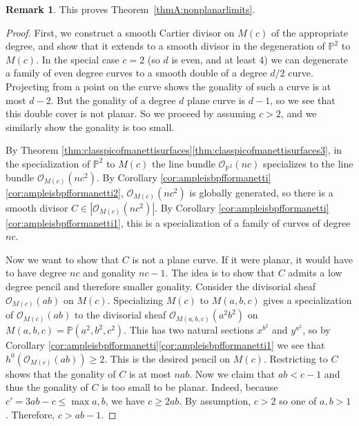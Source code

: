 \documentclass[JEP,XML,SOM,Unicode,NoFloatCountersInSection,published]{cedram}
\theoremstyle{plain}
\theoremstyle{definition}
\newtheorem{remark}[theorem]{Remark}
\newcommand\PP{{\mathbb{P}}}
\newcommand\Oc{{\mathcal O}}
\newcommand\Pabc{{\PP(a^2,b^2,c^2)}}
\begin{document}
\begin{remark}
This proves Theorem~\ref{thmA:nonplanarlimits}.
\end{remark}

\begin{proof}
First, we construct a smooth Cartier divisor on $M(c)$ of the appropriate degree, and show that it extends to a smooth divisor in the degeneration of $\PP^2$ to $M(c)$. In the special case $c=2$ (so $d$ is even, and at least 4) we can degenerate a family of even degree curves to a smooth double of a degree $d/2$ curve. Projecting from a point on the curve shows the gonality of such a curve is at most $d-2$. But the gonality of a degree $d$ plane curve is $d-1$, so we see that this double cover is not planar. So we proceed by assuming $c>2$, and we similarly show the gonality is too small.

By Theorem \ref{thm:classpicofmanettisurfaces}\eqref{thm:classpicofmanettisurfaces3}, in the specialization of $\PP^2$ to $M(c)$ the line bundle $\Oc_{\PP^2}(nc)$ specializes to the line bundle $\Oc_{M(c)}(nc^2)$. By Corollary \ref{cor:ampleisbpfformanetti}\eqref{cor:ampleisbpfformanetti2}, $\Oc_{M(c)}(nc^2)$ is globally generated, so there is a smooth divisor $C\in |\Oc_{M(c)}(nc^2)|$. By Corollary \ref{cor:ampleisbpfformanetti}\eqref{cor:ampleisbpfformanetti1}, this is a specialization of a family of curves of degree $nc$.

Now we want to show that $C$ is not a plane curve. If it were planar, it would have to have degree $nc$ and gonality $nc-1$. The idea is to show that $C$ admits a low degree pencil and therefore smaller gonality. Consider the divisorial sheaf $\Oc_{M(c)}(ab)$ on $M(c)$. Specializing $M(c)$ to $M(a,b,c)$ gives a specialization of $\Oc_{M(c)}(ab)$ to the divisorial sheaf $\Oc_{M(a,b,c)}(a^2b^2)$ on $M(a,b,c)=\Pabc$. This has two natural sections $x^{b^2}$ and $y^{a^2}$, so by Corollary \ref{cor:ampleisbpfformanetti}\eqref{cor:ampleisbpfformanetti1} we see that $h^0(\Oc_{M(c)}(ab))\ge 2$. This is the desired pencil on $M(c)$. Restricting to $C$ shows that the gonality of $C$ is at most $nab$. Now we claim that $ab< c-1$ and thus the gonality of $C$ is too small to be planar. Indeed, because $c' = 3ab - c \le \max{a,b}$, we have $c \ge 2ab$. By assumption, $c > 2$ so one of $a,b > 1$. Therefore, $c > ab -1$.
\end{proof}
\end{document}
